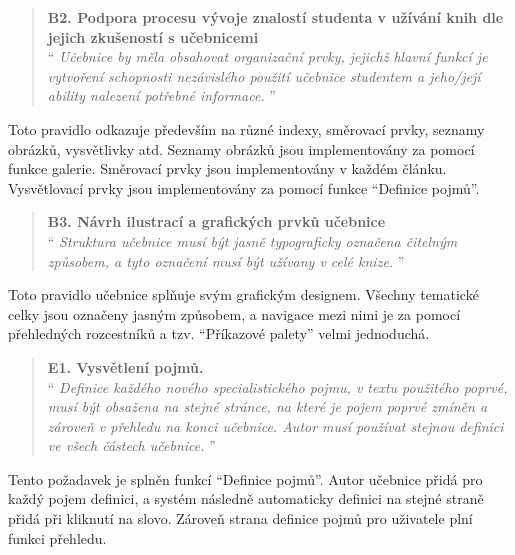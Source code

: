 \documentclass[12pt]{article}
\begin{document}
\filbreak

\begin{samepage}
	\begin{quotation}
		\textbf{B2. Podpora procesu vývoje znalostí studenta v užívání knih dle jejich zkušeností s učebnicemi} \\
		\enquote{\textit{
				Učebnice by měla obsahovat organizační prvky, jejichž hlavní funkcí je vytvoření schopnosti nezávislého použití učebnice studentem a jeho/její ability nalezení potřebné informace.
		}}
	\end{quotation}

	Toto pravidlo odkazuje především na různé indexy, směrovací prvky, seznamy obrázků, vysvětlivky atd. Seznamy obrázků jsou implementovány za pomocí funkce galerie. Směrovací prvky jsou implementovány v každém článku. Vysvětlovací prvky jsou implementovány za pomocí funkce \enquote{Definice pojmů}.
\end{samepage}

\filbreak

\begin{samepage}
	\begin{quotation}
		\textbf{B3. Návrh ilustrací a grafických prvků učebnice} \\
		\enquote{\textit{
				Struktura učebnice musí být jasně typograficky označena čitelným způsobem, a tyto označení musí být užívany v celé knize.
		}}
	\end{quotation}

	Toto pravidlo učebnice splňuje svým grafickým designem. Všechny tematické celky jsou označeny jasným způsobem, a navigace mezi nimi je za pomocí přehledných rozcestníků a tzv.  \enquote{Příkazové palety} velmi jednoduchá.
\end{samepage}

\filbreak

\begin{samepage}
	\begin{quotation}
		\textbf{E1. Vysvětlení pojmů.} \\
		\enquote{\textit{
				Definice každého nového specialistického pojmu, v textu použitého poprvé, musí být obsažena na stejné stránce, na které je pojem poprvé zmíněn a zároveň v přehledu na konci učebnice. Autor musí používat stejnou definici ve všech částech učebnice.
		}}
	\end{quotation}

	Tento požadavek je splněn funkcí \enquote{Definice pojmů}. Autor učebnice přidá pro každý pojem definici, a systém následně automaticky definici na stejné straně přidá při kliknutí na slovo. Zároveň strana definice pojmů pro uživatele plní funkci přehledu.
\end{samepage}
\end{document}
